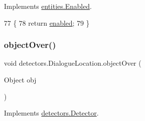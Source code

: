 Implements \mbox{\hyperlink{interfaceentities_1_1_enabled_a3d453026138fed321aed73816b331b49}{entities.\+Enabled}}.


\begin{DoxyCode}
77                                \{
78         \textcolor{keywordflow}{return} \mbox{\hyperlink{classdetectors_1_1_dialogue_location_a724e4fa1eb635dc794cc3a3fde90e947}{enabled}};
79     \}
\end{DoxyCode}
\mbox{\label{classdetectors_1_1_dialogue_location_af092a66a660c8ba78a170b5c4b2af99a}} 
\subsubsection{\texorpdfstring{object\+Over()}{objectOver()}}
{\footnotesize\ttfamily void detectors.\+Dialogue\+Location.\+object\+Over (\begin{DoxyParamCaption}\item[{Object}]{obj }\end{DoxyParamCaption})\hspace{0.3cm}{\ttfamily [inline]}}



Implements \mbox{\hyperlink{interfacedetectors_1_1_detector_ab35eeb78e8216f8100d4651993668d44}{detectors.\+Detector}}.


